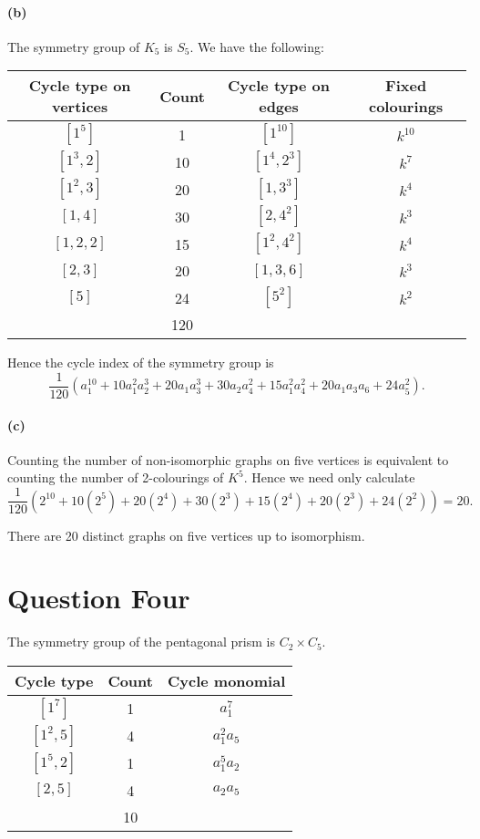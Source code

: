 \documentclass[a4paper,10pt]{amsart}
\begin{document}
\paragraph{(b)}
The symmetry group of $ K_5 $ is $ S_5 $. We have the following:
\begin{center}\begin{tabular}{|c|c|c|c|}\hline
  \textbf{Cycle type on vertices} & \textbf{Count} & \textbf{Cycle type on edges} &\textbf{Fixed colourings}\\\hline
  $ [1^5] $ & 1 & $ [1^{10}] $ & $ k^{10} $\\
  $ [1^3,2] $ & 10 & $ [1^4,2^3] $ & $ k^7 $\\
  $ [1^2,3] $ & 20 & $ [1,3^3] $ & $ k^4 $\\
  $ [1, 4] $ & 30 & $ [2,4^2] $ & $ k^3 $\\
  $ [1,2,2] $ & 15 & $ [1^2,4^2] $ & $ k^4 $\\
  $ [2,3] $ & 20 & $ [1,3,6] $ & $ k^3 $\\
  $ [5] $ & 24 & $ [5^2] $ & $ k^2 $\\\hline
  & 120 &&\\\hline
\end{tabular}\end{center}

Hence the cycle index of the symmetry group is
\begin{displaymath}
  \frac{1}{120}(a_1^{10} + 10a_1^2 a_2^3 + 20a_1 a_3^3 + 30a_2 a_4^2 + 15a_1^2 a_4^2 + 20 a_1 a_3 a_6 + 24a_5^2).
\end{displaymath}

\paragraph{(c)}
Counting the number of non-isomorphic graphs on five vertices is equivalent to counting the number of 2-colourings of $ K^5 $.
Hence we need only calculate
\begin{displaymath}
  \frac{1}{120}(2^{10} + 10(2^5) + 20(2^4) + 30(2^3) + 15(2^4) + 20(2^3) + 24(2^2)) = 20.
\end{displaymath}

There are 20 distinct graphs on five vertices up to isomorphism.

\section*{Question Four}
The symmetry group of the pentagonal prism is $ C_2 \times C_5 $.
\begin{center}\begin{tabular}{|c|c|c|}\hline
  \textbf{Cycle type} & \textbf{Count} & \textbf{Cycle monomial}\\\hline
  $ [1^7] $ & 1 & $ a_1^7 $\\
  $ [1^2,5] $ & 4 & $ a_1^2 a_5 $\\
  $ [1^5,2] $ & 1 & $ a_1^5 a_2 $\\
  $ [2,5] $ & 4 & $ a_2 a_5 $\\\hline
   & 10 &\\\hline
\end{tabular}\end{center}
\end{document}
